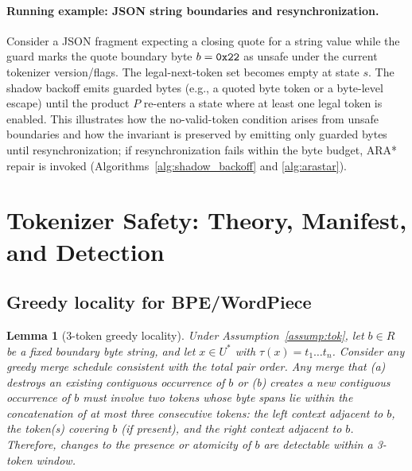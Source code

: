 \documentclass{article}
\def\mathcal#1{#1}%
\newtheorem{lemma}{Lemma}
\begin{document}
\paragraph{Running example: JSON string boundaries and resynchronization.}
Consider a JSON fragment expecting a closing quote for a string value while the guard marks the quote boundary byte $b={\tt 0x22}$ as unsafe under the current tokenizer version/flags. The legal-next-token set becomes empty at state $s$. The shadow backoff emits guarded bytes (e.g., a quoted byte token or a byte-level escape) until the product $\mathcal{P}$ re-enters a state where at least one legal token is enabled. This illustrates how the no-valid-token condition arises from unsafe boundaries and how the invariant is preserved by emitting only guarded bytes until resynchronization; if resynchronization fails within the byte budget, ARA* repair is invoked (Algorithms~\ref{alg:shadow_backoff} and \ref{alg:arastar}).

\section{Tokenizer Safety: Theory, Manifest, and Detection}\label{sec:tokenizers}
\subsection{Greedy locality for BPE/WordPiece}
\begin{lemma}[3-token greedy locality]\label{lem:local}
Under Assumption~\ref{assump:tok}, let $b\in\mathcal{R}$ be a fixed boundary byte string, and let $x\in\mathcal{U}^\ast$ with $\tau(x)=t_1\dots t_n$. Consider any greedy merge schedule consistent with the total pair order. Any merge that (a) destroys an existing contiguous occurrence of $b$ or (b) creates a new contiguous occurrence of $b$ must involve two tokens whose byte spans lie within the concatenation of at most three consecutive tokens: the left context adjacent to $b$, the token(s) covering $b$ (if present), and the right context adjacent to $b$. Therefore, changes to the presence or atomicity of $b$ are detectable within a 3-token window.
\end{lemma}
\end{document}
